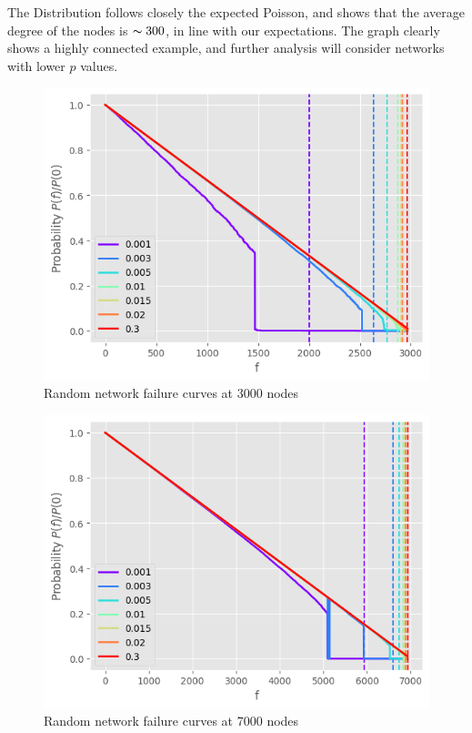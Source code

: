 \documentclass[
]{article}
\begin{document}
The Distribution follows closely the expected Poisson, and shows that
the average degree of the nodes is \(\thicksim 300\), in line with our
expectations. The graph clearly shows a highly connected example, and
further analysis will consider networks with lower \(p\) values.

\begin{figure}
\centering
\includegraphics{assets/random_3000.png}
\caption{Random network failure curves at 3000 nodes}
\end{figure}

\begin{figure}
\centering
\includegraphics{assets/random_7000.png}
\caption{Random network failure curves at 7000 nodes}
\end{figure}
\end{document}
